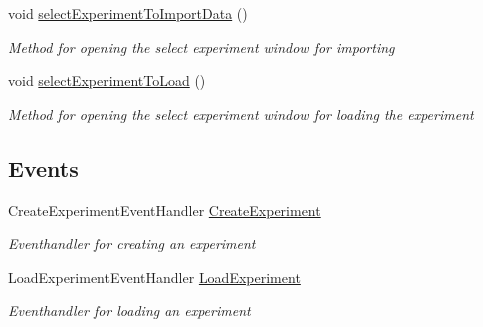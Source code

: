 \begin{DoxyCompactItemize}
void \hyperlink{class_web_analyzer_1_1_u_i_1_1_interaction_objects_1_1_experiment_wizard_obj_a65595483af6122f00e4caa0b0bc5138a}{select\+Experiment\+To\+Import\+Data} ()
\begin{DoxyCompactList}\small\item\em Method for opening the select experiment window for importing \end{DoxyCompactList}\item 
void \hyperlink{class_web_analyzer_1_1_u_i_1_1_interaction_objects_1_1_experiment_wizard_obj_a187c4039f4ed7c0bdca88b2abbebc606}{select\+Experiment\+To\+Load} ()
\begin{DoxyCompactList}\small\item\em Method for opening the select experiment window for loading the experiment \end{DoxyCompactList}\end{DoxyCompactItemize}
\subsection*{Events}
\begin{DoxyCompactItemize}
\item 
Create\+Experiment\+Event\+Handler \hyperlink{class_web_analyzer_1_1_u_i_1_1_interaction_objects_1_1_experiment_wizard_obj_a95676a614efb19092a4522290e47ef96}{Create\+Experiment}
\begin{DoxyCompactList}\small\item\em Eventhandler for creating an experiment \end{DoxyCompactList}\item 
Load\+Experiment\+Event\+Handler \hyperlink{class_web_analyzer_1_1_u_i_1_1_interaction_objects_1_1_experiment_wizard_obj_a4ab54f4e59198b7ff3e9b91ad5049642}{Load\+Experiment}
\begin{DoxyCompactList}\small\item\em Eventhandler for loading an experiment \end{DoxyCompactList}\end{DoxyCompactItemize}
